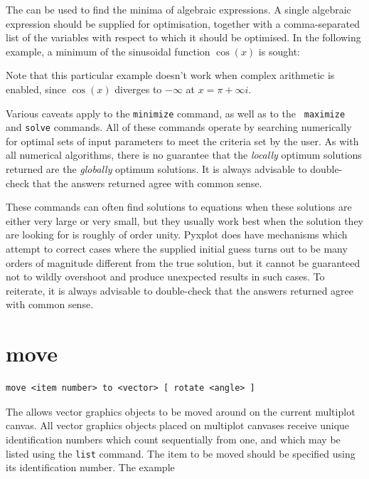 The  can be used to find the minima of algebraic expressions.
A single algebraic expression should be supplied for optimisation, together
with a comma-separated list of the variables with respect to which it should be
optimised. In the following example, a minimum of the sinusoidal function
$\cos(x)$ is sought:

\vspace{3mm}

\vspace{3mm}

\noindent Note that this particular example doesn't work when complex
arithmetic is enabled, since $\cos(x)$ diverges to $-\infty$ at $x=\pi+\infty
i$.

Various caveats apply to the {\tt minimize} command, as well as to the {\tt
maximize} and {\tt solve} commands.  All of these commands operate by searching
numerically for optimal sets of input parameters to meet the criteria set by
the user. As with all numerical algorithms, there is no guarantee that the {\it
locally} optimum solutions returned are the {\it globally} optimum solutions.
It is always advisable to double-check that the answers returned agree with
common sense.

These commands can often find solutions to equations when these solutions are
either very large or very small, but they usually work best when the solution
they are looking for is roughly of order unity.  Pyxplot does have mechanisms
which attempt to correct cases where the supplied initial guess turns out to be
many orders of magnitude different from the true solution, but it cannot be
guaranteed not to wildly overshoot and produce unexpected results in such
cases.  To reiterate, it is always advisable to double-check that the answers
returned agree with common sense.


\section{move}

\begin{verbatim}
move <item number> to <vector> [ rotate <angle> ]
\end{verbatim}

The  allows vector graphics objects to be moved around on the
current multiplot canvas. All vector graphics objects placed on multiplot
canvases receive unique identification numbers which count sequentially from
one, and which may be listed using the {\tt list} command. The item to be moved
should be specified using its identification number. The example

